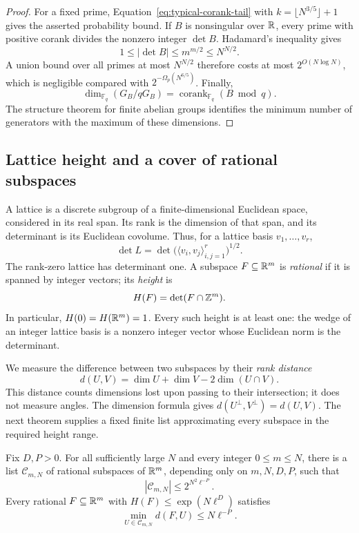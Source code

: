 \begin{proof}
For a fixed prime, Equation~\eqref{eq:typical-corank-tail} with
\(k=\lfloor N^{3/5}\rfloor+1\) gives the asserted probability bound.
If \(B\) is nonsingular over \(\mathbb R\), every prime with positive corank
divides the nonzero integer \(\det B\). Hadamard's inequality gives
\[
 1\le |\det B|\le m^{m/2}\le N^{N/2}.
\]
A union bound over all primes at most \(N^{N/2}\) therefore costs at
most \(2^{O(N\log N)}\), which is negligible compared with
\(2^{-\Omega_p(N^{6/5})}\). Finally,
\[
 \dim_{\mathbb F_q}(G_B/qG_B)
 =\operatorname{corank}_{\mathbb F_q}(B\bmod q).
\]
The structure theorem for finite abelian groups identifies the minimum
number of generators with the maximum of these dimensions.
\end{proof}

\subsection{Lattice height and a cover of rational subspaces}

A lattice is a discrete subgroup of a finite-dimensional Euclidean space,
considered in its real span. Its rank is the dimension of that span, and
its determinant is its Euclidean covolume. Thus, for a lattice basis
\(v_1,\ldots,v_r\),
\[
 \det L=\det\bigl(\langle v_i,v_j\rangle_{i,j=1}^r\bigr)^{1/2}.
\]
The rank-zero lattice has determinant one. A subspace
\(F\subseteq\mathbb R^m\) is \emph{rational} if it is spanned by integer
vectors; its \emph{height} is
\[
 H(F)=\det(F\cap\mathbb Z^m).
\]
In particular, \(H(0)=H(\mathbb R^m)=1\). Every such height is at least one:
the wedge of an integer lattice basis is a nonzero integer vector whose
Euclidean norm is the determinant.

We measure the difference between two subspaces by their \emph{rank distance}
\[
 d(U,V)=\dim U+\dim V-2\dim(U\cap V).
\]
This distance counts dimensions lost upon passing to their intersection;
it does not measure angles. The dimension formula gives
\(d(U^\perp,V^\perp)=d(U,V)\). The next theorem supplies a fixed finite
list approximating every subspace in the required height range.

\begin{theorem}
\label{thm:height-cover}
Fix \(D,P>0\). For all sufficiently large \(N\) and every integer
\(0\le m\le N\), there is a list \(\mathcal C_{m,N}\) of rational
subspaces of \(\mathbb R^m\), depending only on \(m,N,D,P\), such that
\[
 |\mathcal C_{m,N}|\le 2^{N^2\ell^{-P}}.
\]
Every rational \(F\subseteq\mathbb R^m\) with
\(H(F)\le\exp(N\ell^D)\) satisfies
\[
 \min_{U\in\mathcal C_{m,N}}d(F,U)\le N\ell^{-P}.
\]
\end{theorem}

